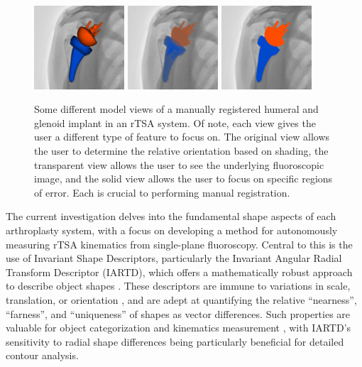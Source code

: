 \begin{figure}[h!]
	\centering
	\includegraphics[width=0.3\textwidth]{TSA_original.png}
	\includegraphics[width=0.3\textwidth]{TSA_transparent.png}
	\includegraphics[width=0.3\textwidth]{TSA_solid.png}
	\caption{Some different model views of a manually registered humeral and glenoid implant in an rTSA system. Of note, each view gives the user a different type of feature to focus on. The original view allows the user to determine the relative orientation based on shading, the transparent view allows the user to see the underlying fluoroscopic image, and the solid view allows the user to focus on specific regions of error. Each is crucial to performing manual registration.}
	\label{fig:TSA-multiview}
\end{figure}

The current investigation delves into the fundamental shape aspects of each arthroplasty system, with a focus on developing a method for autonomously measuring rTSA kinematics from single-plane fluoroscopy.
Central to this is the use of Invariant Shape Descriptors, particularly the Invariant Angular Radial Transform Descriptor (IARTD), which offers a mathematically robust approach to describe object shapes \cite{leeNewShapeDescription2012}.
These descriptors are immune to variations in scale, translation, or orientation \cite{zhangReviewShapeRepresentation2004}, and are adept at quantifying the relative ``nearness'', ``farness'', and ``uniqueness'' of shapes as vector differences.
Such properties are valuable for object categorization \cite{richardIdentificationThreeDimensionalObjects1974,wallaceAnalysisThreedimensionalMovement1980,wallaceEfficientThreedimensionalAircraft1980} and kinematics measurement \cite{banksAccurateMeasurementThreedimensional1996}, with IARTD's sensitivity to radial shape differences \cite{leeNewShapeDescription2012} being particularly beneficial for detailed contour analysis.

